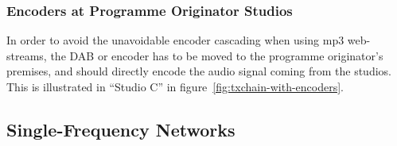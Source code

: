 \subsubsection{Encoders at Programme Originator Studios}
In order to avoid the unavoidable encoder cascading when using mp3 web-streams,
the DAB or \dabplus encoder has to be moved to the programme originator's
premises, and should directly encode the audio signal coming from the studios.
This is illustrated in ``Studio C'' in figure~\ref{fig:txchain-with-encoders}.


\subsection{Single-Frequency Networks}
